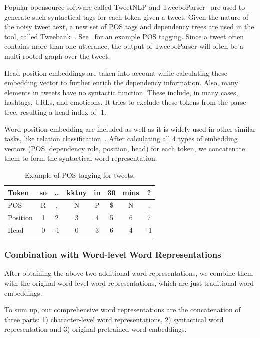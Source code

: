 Popular opensource software called TweetNLP and TweeboParser~\cite{owoputi2013improved,kong2014dependency} are used to generate such syntactical tags for each token given a tweet.
Given the nature of the noisy tweet text, a new set of POS tags and dependency trees are used in the tool, called Tweebank~\cite{gimpel2011part}. See~ for an example POS tagging. Since a tweet often contains more than one utterance, the output of TweeboParser will often be a multi-rooted graph over the tweet. 

Head position embeddings are taken into account while calculating these embedding vector to further enrich the dependency information. Also, many elements in tweets have no syntactic function. These include, in many cases, hashtags, URLs, and emoticons. It tries to exclude these tokens from the parse tree, resulting a head index of -1.

Word position embedding are included as well as it is widely used in other similar tasks, like relation classification~\cite{xu2016improved}.
After calculating all 4 types of embedding vectors (POS, dependency role, position, head) for each token, we concatenate them to form the syntactical word representation.
\begin{table}[th]
	\small
	\centering
	\caption{Example of POS tagging for tweets.}
	\label{tbl:pos}
	\begin{tabular}{l|c|c|c|c|c|c|c}
		\hline
		Token & so & .. & kktny & in & 30 & mins & ? \\ \hline
		POS   & R  & ,  & N     & P  & \$  & N    & , \\ \hline
		Position & 1&2&3&4&5&6&7\\ \hline
		Head & 0 &-1& 0& 3& 6& 4& -1 \\ \hline
\end{tabular}
\end{table}


\subsubsection{Combination with Word-level Word Representations}
After obtaining the above two additional word representations, we combine them with the original word-level word representations, which are just traditional word embeddings. 

To sum up, our comprehensive word representations are the concatenation of three parts: 1) character-level word representations, 2) syntactical word representation and 3)  original pretrained word embeddings.

